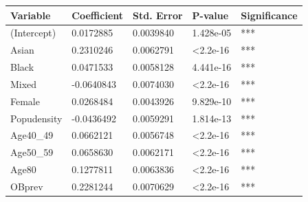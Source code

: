 \begin{table}[]
\centering
\begin{tabular}{|lllll|}
\hline
\multicolumn{1}{|l|}{\textbf{Variable}} & \multicolumn{1}{l|}{\textbf{Coefficient}} & \multicolumn{1}{l|}{\textbf{Std. Error}} & \multicolumn{1}{l|}{\textbf{P-value}}  & \textbf{Significance} \\ \hline
\multicolumn{1}{|l|}{(Intercept)}       & \multicolumn{1}{l|}{0.0172885}            & \multicolumn{1}{l|}{0.0039840}           & \multicolumn{1}{l|}{1.428e-05}         & ***                   \\ \hline
\multicolumn{1}{|l|}{Asian}             & \multicolumn{1}{l|}{0.2310246}            & \multicolumn{1}{l|}{0.0062791}           & \multicolumn{1}{l|}{\textless 2.2e-16} & ***                   \\ \hline
\multicolumn{1}{|l|}{Black}             & \multicolumn{1}{l|}{0.0471533}            & \multicolumn{1}{l|}{0.0058128}           & \multicolumn{1}{l|}{4.441e-16}         & ***                   \\ \hline
\multicolumn{1}{|l|}{Mixed}             & \multicolumn{1}{l|}{-0.0640843}           & \multicolumn{1}{l|}{0.0074030}           & \multicolumn{1}{l|}{\textless 2.2e-16} & ***                   \\ \hline
\multicolumn{1}{|l|}{Female}            & \multicolumn{1}{l|}{0.0268484}            & \multicolumn{1}{l|}{0.0043926}           & \multicolumn{1}{l|}{9.829e-10}         & ***                   \\ \hline
\multicolumn{1}{|l|}{Popudensity}       & \multicolumn{1}{l|}{-0.0436492}           & \multicolumn{1}{l|}{0.0059291}           & \multicolumn{1}{l|}{1.814e-13}         & ***                   \\ \hline
\multicolumn{1}{|l|}{Age40\_49}         & \multicolumn{1}{l|}{0.0662121}            & \multicolumn{1}{l|}{0.0056748}           & \multicolumn{1}{l|}{\textless 2.2e-16} & ***                   \\ \hline
\multicolumn{1}{|l|}{Age50\_59}         & \multicolumn{1}{l|}{0.0658630}            & \multicolumn{1}{l|}{0.0062171}           & \multicolumn{1}{l|}{\textless 2.2e-16} & ***                   \\ \hline
\multicolumn{1}{|l|}{Age80}             & \multicolumn{1}{l|}{0.1277811}            & \multicolumn{1}{l|}{0.0063836}           & \multicolumn{1}{l|}{\textless 2.2e-16} & ***                   \\ \hline
\multicolumn{1}{|l|}{OBprev}            & \multicolumn{1}{l|}{0.2281244}            & \multicolumn{1}{l|}{0.0070629}           & \multicolumn{1}{l|}{\textless 2.2e-16} & ***                   \\ \hline

\end{tabular}
\end{table}
